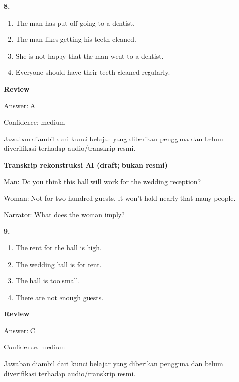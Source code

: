 \documentclass[12pt]{article}
\begin{document}
\noindent\textbf{8.}
\begin{enumerate}[label=(\Alph*),leftmargin=*,itemsep=0.2em]
\item The man has put off going to a dentist.
\item The man likes getting his teeth cleaned.
\item She is not happy that the man went to a dentist.
\item Everyone should have their teeth cleaned regularly.
\end{enumerate}
\par
\begingroup
\setlength{\parskip}{0pt}
\setlength{\parindent}{0pt}
\textbf{Review}\par
Answer: A\par
Confidence: medium\par
Jawaban diambil dari kunci belajar yang diberikan pengguna dan belum diverifikasi terhadap audio/transkrip resmi.\par
\endgroup
\par
\vspace{0.25\baselineskip}
\begin{exampleblock}
\textbf{Transkrip rekonstruksi AI (draft; bukan resmi)}\par
Man: Do you think this hall will work for the wedding reception?\par
Woman: Not for two hundred guests. It won't hold nearly that many people.\par
Narrator: What does the woman imply?\par
\end{exampleblock}
\noindent\textbf{9.}
\begin{enumerate}[label=(\Alph*),leftmargin=*,itemsep=0.2em]
\item The rent for the hall is high.
\item The wedding hall is for rent.
\item The hall is too small.
\item There are not enough guests.
\end{enumerate}
\par
\begingroup
\setlength{\parskip}{0pt}
\setlength{\parindent}{0pt}
\textbf{Review}\par
Answer: C\par
Confidence: medium\par
Jawaban diambil dari kunci belajar yang diberikan pengguna dan belum diverifikasi terhadap audio/transkrip resmi.\par
\endgroup
\par
\end{document}
